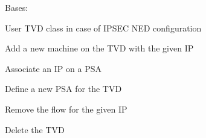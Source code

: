 \documentclass[letterpaper,10pt,oneside]{sphinxmanual}
\begin{document}
\begin{fulllineitems}
\label{userTVD:userTVD.UserTVD}
Bases: 

User TVD class in case of IPSEC NED configuration

\begin{fulllineitems}
\label{userTVD:userTVD.UserTVD.addNewIP}
Add a new machine on the TVD with the given IP

\end{fulllineitems}


\begin{fulllineitems}
\label{userTVD:userTVD.UserTVD.associateIPPSA}
Associate an IP on a PSA

\end{fulllineitems}


\begin{fulllineitems}
\label{userTVD:userTVD.UserTVD.definePSA}
Define a new PSA for the TVD

\end{fulllineitems}


\begin{fulllineitems}
\label{userTVD:userTVD.UserTVD.delUserIP}
Remove the flow for the given IP

\end{fulllineitems}


\begin{fulllineitems}
\label{userTVD:userTVD.UserTVD.deleteAllTVD}
Delete the TVD

\end{fulllineitems}



\end{fulllineitems}
\end{document}
